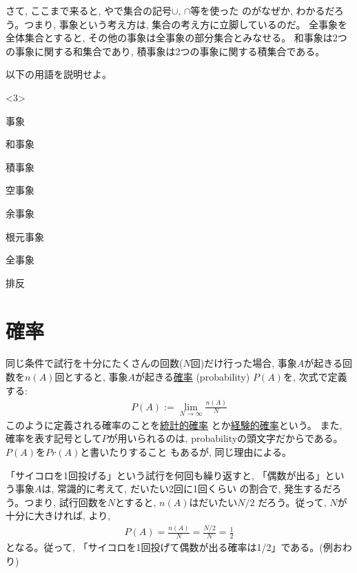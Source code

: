 さて, ここまで来ると, やで集合の記号$\cup$, $\cap$等を使った
のがなぜか, わかるだろう。つまり, 事象という考え方は, 集合の考え方に立脚しているのだ。
全事象を全体集合とすると, その他の事象は全事象の部分集合とみなせる。
和事象は2つの事象に関する和集合であり, 積事象は2つの事象に関する積集合である。
\mv

\begin{q}\label{q:stat_words0} 以下の用語を説明せよ。
\begin{edaenumerate}<3>
\item 事象
\item 和事象
\item 積事象
\item 空事象
\item 余事象
\item 根元事象
\item 全事象
\item 排反
\end{edaenumerate}\end{q}
\vv



\section{確率}

同じ条件で試行を十分にたくさんの回数($N$回)だけ行った場合, 事象$A$が起きる回数を$n(A)$回とすると, 
事象$A$が起きる\underline{確率} (probability) $P(A)$を, 次式で定義する:
\begin{eqnarray}P(A):=\lim_{N\rightarrow\infty}\frac{n(A)}{N}\label{eq:def_prob_stat}\end{eqnarray}
このように定義される確率のことを\underline{統計的確率}
とか\underline{経験的確率}という。
また, 確率を表す記号として$P$が用いられるのは, 
probabilityの頭文字だからである。$P(A)$を$Pr(A)$と書いたりすること
もあるが, 同じ理由による。
\mv

\begin{exmpl} 「サイコロを1回投げる」という試行を何回も繰り返すと, 
「偶数が出る」という事象$A$は, 常識的に考えて, だいたい2回に1回くらい
の割合で, 発生するだろう。つまり, 試行回数を$N$とすると, $n(A)$はだいたい$N/2$
だろう。従って, $N$が十分に大きければ, より, 
\begin{eqnarray}P(A)=\frac{n(A)}{N}=\frac{N/2}{N}=\frac{1}{2}\end{eqnarray}
となる。従って, 「サイコロを1回投げて偶数が出る確率は1/2」である。(例おわり)\end{exmpl}
\mv

